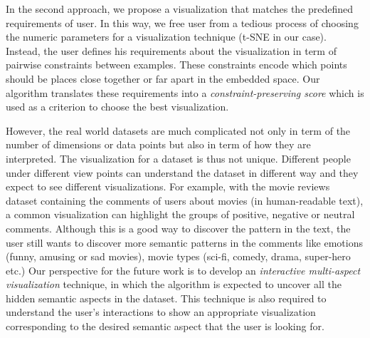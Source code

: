 In the second approach, we propose a visualization that matches the predefined requirements of user.
In this way, we free user from a tedious process of choosing the numeric parameters for a visualization technique (t-SNE in our case).
Instead, the user defines his requirements about the visualization in term of pairwise constraints between examples.
These constraints encode which points should be places close together or far apart in the embedded space.
Our algorithm translates these requirements into a \emph{constraint-preserving score} which is used as a criterion to choose the best visualization.

However, the real world datasets are much complicated not only in term of the number of dimensions or data points but also in term of how they are interpreted.
The visualization for a dataset is thus not unique. Different people under different view points can understand the dataset in different way and they expect to see different visualizations.
For example, with the movie reviews dataset containing the comments of users about movies (in human-readable text), a common visualization can highlight the groups of positive, negative or neutral comments.
Although this is a good way to discover the pattern in the text, the user still wants to discover more semantic patterns in the comments like emotions (funny, amusing or sad movies), movie types (sci-fi, comedy, drama, super-hero etc.)
Our perspective for the future work is to develop an \emph{interactive multi-aspect visualization} technique, in which the algorithm is expected to uncover all the hidden semantic aspects in the dataset.
This technique is also required to understand the user's interactions to show an appropriate visualization corresponding to the desired semantic aspect that the user is looking for.